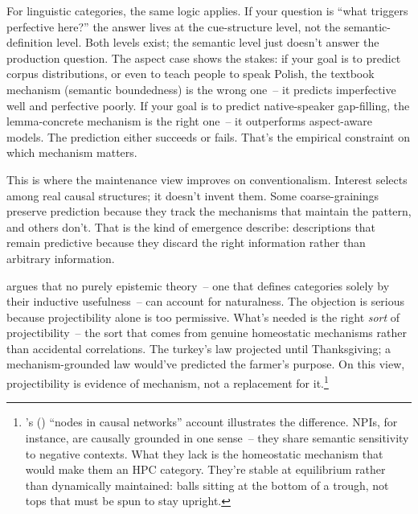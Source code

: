 For linguistic categories, the same logic applies. If your question is \enquote{what triggers perfective here?} the answer lives at the cue-structure level, not the semantic-definition level. Both levels exist; the semantic level just doesn't answer the production question. The aspect case shows the stakes: if your goal is to predict corpus distributions, or even to teach people to speak Polish, the textbook mechanism (semantic boundedness) is the wrong one~-- it predicts imperfective well and perfective poorly. If your goal is to predict native-speaker gap-filling, the lemma-concrete mechanism is the right one~-- it outperforms aspect-aware models. The prediction either succeeds or fails. That's the empirical constraint on which mechanism matters.

This is where the maintenance view improves on conventionalism. Interest selects among real causal structures; it doesn't invent them. Some coarse-grainings preserve prediction because they track the mechanisms that maintain the pattern, and others don't. That is the kind of emergence \textcite{carrollparola2024} describe: descriptions that remain predictive because they discard the right information rather than arbitrary information.

\textcite{lemeire2018} argues that no purely epistemic theory~-- one that defines categories solely by their inductive usefulness~-- can account for naturalness. The objection is serious because projectibility alone is too permissive. What's needed is the right \emph{sort} of projectibility~-- the sort that comes from genuine homeostatic mechanisms rather than accidental correlations. The turkey's law projected until Thanksgiving; a mechanism-grounded law would've predicted the farmer's purpose. On this view, projectibility is evidence of mechanism, not a replacement for it.\footnote{\citeauthor{khalidi2013}'s (\citeyear{khalidi2013}) \enquote{nodes in causal networks} account illustrates the difference. NPIs, for instance, are causally grounded in one sense~-- they share semantic sensitivity to negative contexts. What they lack is the homeostatic mechanism that would make them an HPC category. They're stable at equilibrium rather than dynamically maintained: balls sitting at the bottom of a trough, not tops that must be spun to stay upright.}

